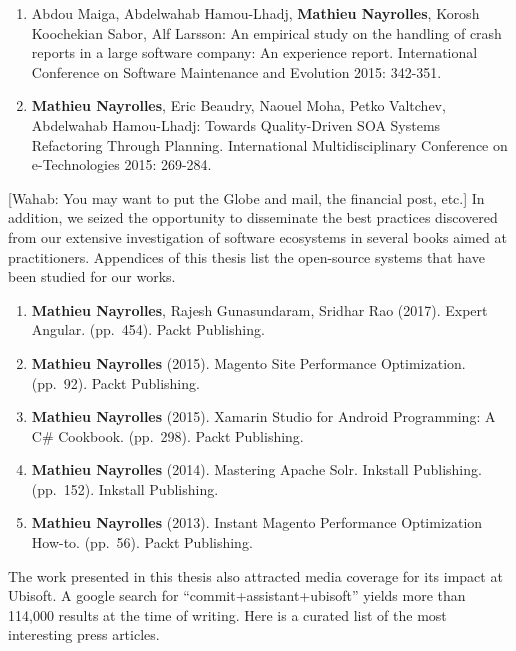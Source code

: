 \documentclass[12pt]{report}
\begin{document}
\begin{enumerate}
\def\labelenumi{\arabic{enumi}.}
\setcounter{enumi}{6}
\item
  Abdou Maiga, Abdelwahab Hamou-Lhadj, \textbf{Mathieu Nayrolles},
  Korosh Koochekian Sabor, Alf Larsson: An empirical study on the
  handling of crash reports in a large software company: An experience
  report. International Conference on Software Maintenance and Evolution
  2015: 342-351.
\item
  \textbf{Mathieu Nayrolles}, Eric Beaudry, Naouel Moha, Petko Valtchev,
  Abdelwahab Hamou-Lhadj: Towards Quality-Driven SOA Systems Refactoring
  Through Planning. International Multidisciplinary Conference on
  e-Technologies 2015: 269-284.
\end{enumerate}

[Wahab: You may want to put the Globe and mail, the financial post, etc.]
In addition, we seized the opportunity to disseminate the best practices
discovered from our extensive investigation of software ecosystems in
several books aimed at practitioners. Appendices of this thesis list the
open-source systems that have been studied for our works.

\begin{enumerate}
\def\labelenumi{\arabic{enumi}.}
\setcounter{enumi}{8}
\item
  \textbf{Mathieu Nayrolles}, Rajesh Gunasundaram, Sridhar Rao (2017).
  Expert Angular. (pp.~454). Packt Publishing.
\item
  \textbf{Mathieu Nayrolles} (2015). Magento Site Performance
  Optimization. (pp.~92). Packt Publishing.
\item
  \textbf{Mathieu Nayrolles} (2015). Xamarin Studio for Android
  Programming: A C\# Cookbook. (pp.~298). Packt Publishing.
\item
  \textbf{Mathieu Nayrolles} (2014). Mastering Apache Solr. Inkstall
  Publishing. (pp.~152). Inkstall Publishing.
\item
  \textbf{Mathieu Nayrolles} (2013). Instant Magento Performance
  Optimization How-to. (pp.~56). Packt Publishing.
\end{enumerate}

The work presented in this thesis also attracted media coverage
for its impact at Ubisoft. A google search for ``commit+assistant+ubisoft'' yields more
than 114,000 results at the time of writing. Here is a curated list of
the most interesting press articles.
\end{document}

